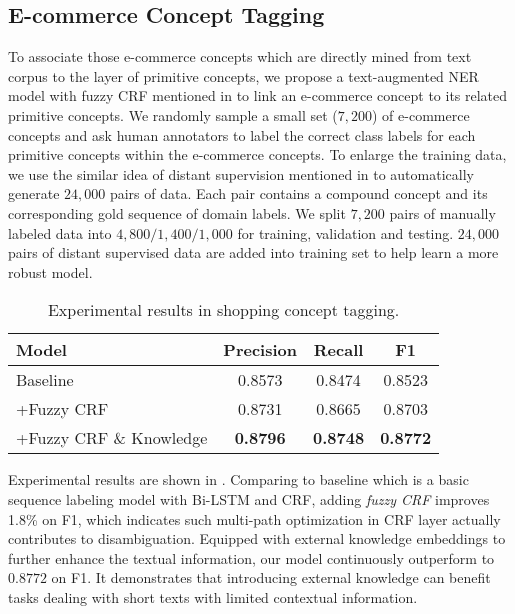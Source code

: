 
\subsection{E-commerce Concept Tagging}

To associate those e-commerce concepts which are directly mined from text corpus to the layer of primitive concepts,
we propose a text-augmented NER model with fuzzy CRF mentioned in 
to link an e-commerce concept to its related primitive concepts.
We randomly sample a small set ($7,200$) of e-commerce concepts
and ask human annotators to label the correct class labels for each primitive concepts within the e-commerce concepts.
To enlarge the training data, 
we use the similar idea of distant supervision mentioned in 
to automatically generate $24,000$ pairs of data.
Each pair contains a compound concept and its corresponding gold sequence of domain labels.
We split $7,200$ pairs of manually labeled data into 
$4,800/1,400/1,000$ for training, validation and testing.
$24,000$ pairs of distant supervised data are added into training set to help learn a more robust model.

\begin{table}[th]
	\centering
	\begin{tabular}{l|c|c|c}
		\hline
		Model & Precision &  Recall & F1  \\
		\hline
		Baseline & 0.8573 & 0.8474 &	0.8523 \\
		+Fuzzy CRF  & 0.8731 &  0.8665 & 0.8703 \\
		+Fuzzy CRF \& Knowledge & \textbf{0.8796} &  \textbf{0.8748} & \textbf{0.8772} \\
		\hline
	\end{tabular}
	\caption{Experimental results in shopping concept tagging.}
	\label{tab:linking}
\end{table}

Experimental results are shown in .
Comparing to baseline which is a basic sequence labeling model with Bi-LSTM and CRF, 
adding \textit{fuzzy CRF} improves 1.8\% on F1, 
which indicates such multi-path optimization in CRF layer actually contributes to disambiguation.
Equipped with external knowledge embeddings to further enhance the textual information, 
our model continuously outperform to $0.8772$ on F1.
It demonstrates that introducing external knowledge can benefit tasks dealing with short texts with limited contextual information.